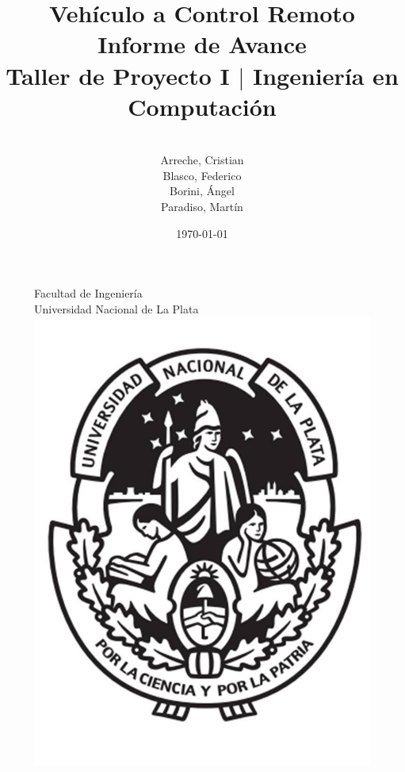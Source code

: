 \documentclass[12pt, spanish]{report}
\begin{document}
	
	\begin{titlepage}
		\title{
			\Huge Vehículo a Control Remoto\\ Informe de Avance\\
			\vspace{20pt}
			\Large{Taller de Proyecto I $|$ Ingeniería en Computación}
		}
		
		\author{
			\vspace{20pt}\\
			Arreche, Cristian\\
			Blasco, Federico\\
			Borini, Ángel\\
			Paradiso, Martín
		}
		
		\date{\today}
		
		\begin{figure}[b]
		\centering
		\Large{Facultad de Ingeniería}\\
		\vspace{2pt}
		\Large{Universidad Nacional de La Plata}\\
		\vspace{10pt}
		\includegraphics[width=0.2\linewidth]{logo_unlp.jpg}

		\end{figure}
	
	\maketitle
	\end{titlepage}
	\thispagestyle{empty}
	
	\tableofcontents
	
	
	
	
	
	
	
	
	
	
	
	
	
	
	
	
	
	
	
	
	
	
	
\end{document}
